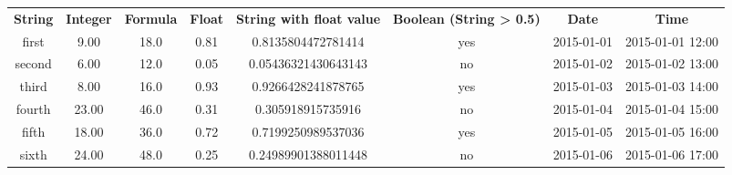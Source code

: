 \begin{tabular}{c|c|c|c|c|c|c|c|}
\textbf{String} & \textbf{Integer} & \textbf{Formula} & \textbf{Float} & \textbf{String with float value} & \textbf{Boolean (String \textgreater{} 0.5)} & \textbf{Date} & \textbf{Time}\\
first & 9.00 & 18.0 & 0.81 & 0.8135804472781414 & yes & 2015-01-01 & 2015-01-01 12:00\\
second & 6.00 & 12.0 & 0.05 & 0.05436321430643143 & no & 2015-01-02 & 2015-01-02 13:00\\
third & 8.00 & 16.0 & 0.93 & 0.9266428241878765 & yes & 2015-01-03 & 2015-01-03 14:00\\
fourth & 23.00 & 46.0 & 0.31 & 0.305918915735916 & no & 2015-01-04 & 2015-01-04 15:00\\
fifth & 18.00 & 36.0 & 0.72 & 0.7199250989537036 & yes & 2015-01-05 & 2015-01-05 16:00\\
sixth & 24.00 & 48.0 & 0.25 & 0.24989901388011448 & no & 2015-01-06 & 2015-01-06 17:00
\end{tabular}